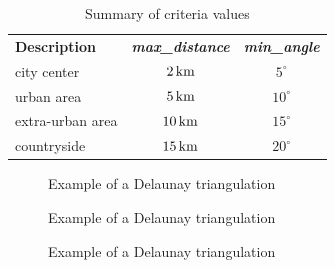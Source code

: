 \documentclass[lettersize,journal,english]{IEEEtran}
\begin{document}
\begin{table}[!b]
    \centering
    \caption{Summary of criteria values}
    \label{table:crit_summary}
    \begin{tabular}{lcc}
        \toprule
        \textbf{Description} & \textbf{\emph{max\_distance}} & \textbf{\emph{min\_angle}} \\
        \cmidrule(lr){1-3}
        city center & $\unit[2]{km}$ & $5^\circ$ \\
        urban area & $\unit[5]{km}$ & $10^\circ$ \\
        extra-urban area & $\unit[10]{km}$ & $15^\circ$ \\
        countryside & $\unit[15]{km}$ & $20^\circ$ \\
        \bottomrule
    \end{tabular}
\end{table}

\begin{figure}[!t]
    \centering
    \caption{Example of a Delaunay triangulation}
    \label{fig:crit_pts}
\end{figure}

\begin{figure}[!b]
    \centering
    \caption{Example of a Delaunay triangulation}
    \label{fig:crit_dis}
\end{figure}

\begin{figure}[!t]
    \centering
    \caption{Example of a Delaunay triangulation}
    \label{fig:crit_ang}
\end{figure}
\end{document}
